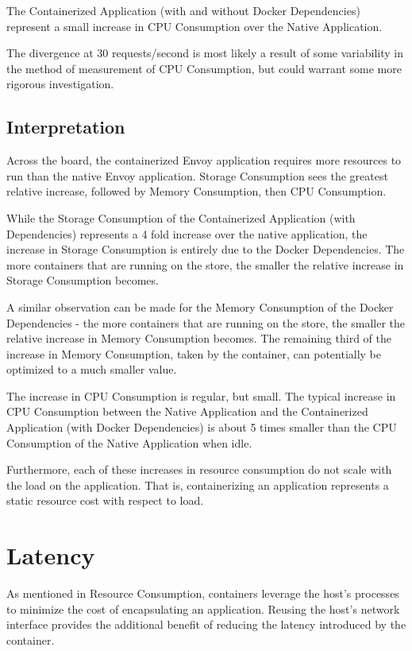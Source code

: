 \documentclass{article}
\begin{document}
The Containerized Application (with and without Docker Dependencies) represent a small increase in CPU Consumption over the Native Application.

The divergence at 30 requests/second is most likely a result of some variability in the method of measurement of CPU Consumption, but could warrant some more rigorous investigation.

\subsection{Interpretation}
Across the board, the containerized Envoy application requires more resources to run than the native Envoy application. Storage Consumption sees the greatest relative increase, followed by Memory Consumption, then CPU Consumption.

While the Storage Consumption of the Containerized Application (with Dependencies) represents a 4 fold increase over the native application, the increase in Storage Consumption is entirely due to the Docker Dependencies. The more containers that are running on the store, the smaller the relative increase in Storage Consumption becomes.

A similar observation can be made for the Memory Consumption of the Docker Dependencies - the more containers that are running on the store, the smaller the relative increase in Memory Consumption becomes. The remaining third of the increase in Memory Consumption, taken by the container, can potentially be optimized to a much smaller value.

The increase in CPU Consumption is regular, but small. The typical increase in CPU Consumption between the Native Application and the Containerized Application (with Docker Dependencies) is about 5 times smaller than the CPU Consumption of the Native Application when idle.

Furthermore, each of these increases in resource consumption do not scale with the load on the application. That is, containerizing an application represents a static resource cost with respect to load.

\section{Latency}
As mentioned in Resource Consumption, containers leverage the host's processes to minimize the cost of encapsulating an application. Reusing the host's network interface provides the additional benefit of reducing the latency introduced by the container.
\end{document}
